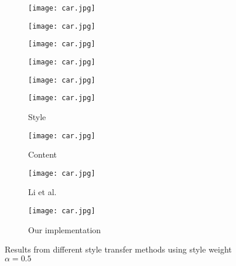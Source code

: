 \begin{figure}[H]
\begin{subfigure}[b]{0.225\linewidth}
		\texttt{[image: car.jpg]} %
	\end{subfigure}
	\centering
	\begin{subfigure}[b]{0.225\linewidth}
		\texttt{[image: car.jpg]} %
	\end{subfigure}
	\begin{subfigure}[b]{0.225\linewidth}
		\texttt{[image: car.jpg]} %
	\end{subfigure}
	\begin{subfigure}[b]{0.225\linewidth}
		\texttt{[image: car.jpg]} %
	\end{subfigure}
	\begin{subfigure}[b]{0.225\linewidth}
		\texttt{[image: car.jpg]} %
	\end{subfigure}
	\centering
	\begin{subfigure}[b]{0.225\linewidth}
		\texttt{[image: car.jpg]} %
		\caption{Style}
	\end{subfigure}
	\begin{subfigure}[b]{0.225\linewidth}
		\texttt{[image: car.jpg]} %
		\caption{Content}
	\end{subfigure}
	\begin{subfigure}[b]{0.225\linewidth}
		\texttt{[image: car.jpg]} %
		\caption{Li et al. \cite{bib11}}
	\end{subfigure}
	\begin{subfigure}[b]{0.225\linewidth}
		\texttt{[image: car.jpg]} %
		\caption{Our implementation}
	\end{subfigure}
	\caption{Results from different style transfer methods using style weight $\alpha=0.5$}
	\label{fig:style_transfer}
\end{figure}
